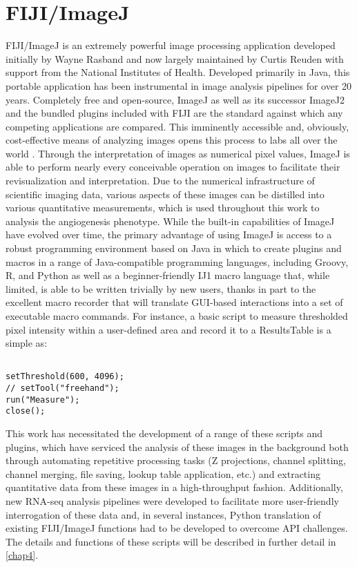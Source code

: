 \section{FIJI/ImageJ}

FIJI/ImageJ is an extremely powerful image processing application developed initially by Wayne Rasband and now largely maintained by Curtis Reuden with support from the National Institutes of Health. Developed primarily in Java, this portable application has been instrumental in image analysis pipelines for over 20 years. Completely free and open-source, ImageJ as well as its successor ImageJ2 and the bundled plugins included with FIJI are the standard against which any competing applications are compared. This imminently accessible and, obviously, cost-effective means of analyzing images opens this process to labs all over the world \citep{Girish2004}. Through the interpretation of images as numerical pixel values, ImageJ is able to perform nearly every conceivable operation on images to facilitate their revisualization and interpretation. Due to the numerical infrastructure of scientific imaging data, various aspects of these images can be distilled into various quantitative measurements, which is used throughout this work to analysis the angiogenesis phenotype. While the built-in capabilities of ImageJ have evolved over time, the primary advantage of using ImageJ is access to a robust programming environment based on Java in which to create plugins and macros in a range of Java-compatible programming languages, including Groovy, R, and Python as well as a beginner-friendly IJ1 macro language that, while limited, is able to be written trivially by new users, thanks in part to the excellent macro recorder that will translate GUI-based interactions into a set of executable macro commands. For instance, a basic script to measure thresholded pixel intensity within a user-defined area and record it to a ResultsTable is a simple as:
 
\begin{lstlisting}

setThreshold(600, 4096);
// setTool("freehand");
run("Measure");
close();

\end{lstlisting}

This work has necessitated the development of a range of these scripts and plugins, which have serviced the analysis of these images in the background both through automating repetitive processing tasks (Z projections, channel splitting, channel merging, file saving, lookup table application, etc.) and extracting quantitative data from these images in a high-throughput fashion. Additionally, new RNA-seq analysis pipelines were developed to facilitate more user-friendly interrogation of these data and, in several instances, Python translation of existing FIJI/ImageJ functions had to be developed to overcome API challenges. The details and functions of these scripts will be described in further detail in \autoref{chap4}. 


